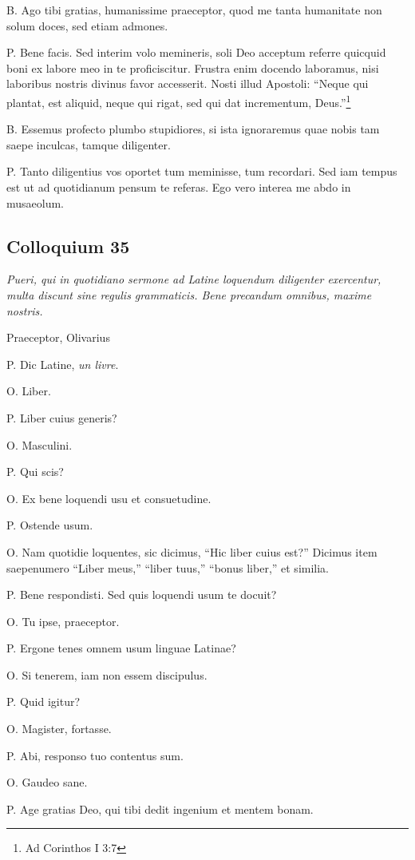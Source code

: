 \documentclass{article}
\begin{document}
B. Ago tibi gratias, humanissime praeceptor, quod me tanta humanitate non solum doces, sed etiam admones.

P. Bene facis. Sed interim volo memineris, soli Deo acceptum referre quicquid boni ex labore meo in te proficiscitur. Frustra enim docendo laboramus, nisi laboribus nostris divinus favor accesserit. Nosti illud Apostoli: ``Neque qui plantat, est aliquid, neque qui rigat, sed qui dat incrementum, Deus.''\footnote{Ad Corinthos I 3:7}

B. Essemus profecto plumbo stupidiores, si ista ignoraremus quae nobis tam saepe inculcas, tamque diligenter.

P. Tanto diligentius vos oportet tum meminisse, tum recordari. Sed iam tempus est ut ad quotidianum pensum te referas. Ego vero interea me abdo in musaeolum.

\subsection{Colloquium 35}
\emph{Pueri, qui in quotidiano sermone ad Latine loquendum diligenter exercentur, multa discunt sine regulis grammaticis. Bene precandum omnibus, maxime nostris.}

Praeceptor, Olivarius

P. Dic Latine, \emph{un livre}.

O. Liber.

P. Liber cuius generis?

O. Masculini.

P. Qui scis?

O. Ex bene loquendi usu et consuetudine.

P. Ostende usum.

O. Nam quotidie loquentes, sic dicimus, ``Hic liber cuius est?'' Dicimus item saepenumero ``Liber meus,'' ``liber tuus,'' ``bonus liber,'' et similia.

P. Bene respondisti. Sed quis loquendi usum te docuit?

O. Tu ipse, praeceptor.

P. Ergone tenes omnem usum linguae Latinae?

O. Si tenerem, iam non essem discipulus.

P. Quid igitur?

O. Magister, fortasse.

P. Abi, responso tuo contentus sum.

O. Gaudeo sane.

P. Age gratias Deo, qui tibi dedit ingenium et mentem bonam.
\end{document}

